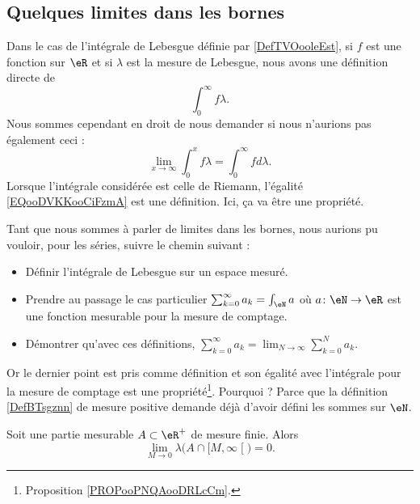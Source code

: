 \subsection{Quelques limites dans les bornes}

Dans le cas de l'intégrale de Lebesgue définie par \ref{DefTVOooleEst}, si \( f\) est une fonction sur \( \eR\) et si \( \lambda\) est la mesure de Lebesgue, nous avons une définition directe de
\begin{equation}
	\int_{0}^{\infty}f\lambda.
\end{equation}
Nous sommes cependant en droit de nous demander si nous n'aurions pas également ceci :
\begin{equation}        \label{EQooDVKKooCiFzmA}
	\lim_{x\to \infty} \int_0^xf\lambda=\int_0^{\infty}fd\lambda.
\end{equation}
Lorsque l'intégrale considérée est celle de Riemann, l'égalité \eqref{EQooDVKKooCiFzmA} est une définition. Ici, ça va être une propriété.

\begin{normaltext}
	Tant que nous sommes à parler de limites dans les bornes, nous aurions pu vouloir, pour les séries, suivre le chemin suivant :
	\begin{itemize}
		\item Définir l'intégrale de Lebesgue sur un espace mesuré.
		\item Prendre au passage le cas particulier \( \sum_{k=0}^{\infty}a_k=\int_\eN a\) où \( a\colon \eN\to \eR\) est une fonction mesurable pour la mesure de comptage.
		\item Démontrer qu'avec ces définitions, \( \sum_{k=0}^{\infty}a_k=\lim_{N\to \infty} \sum_{k=0}^Na_k\).
	\end{itemize}
	Or le dernier point est pris comme définition et son égalité avec l'intégrale pour la mesure de comptage est une propriété\footnote{Proposition \ref{PROPooPNQAooDRLcCm}.}. Pourquoi ? Parce que la définition \ref{DefBTsgznn} de mesure positive demande déjà d'avoir défini les sommes sur \( \eN\).
\end{normaltext}

\begin{lemma}
	Soit une partie mesurable \( A\subset \eR^+\) de mesure finie. Alors
	\begin{equation}
		\lim_{M\to 0} \lambda\big( A\cap\mathopen[ M , \infty \mathclose[ \big)=0.
	\end{equation}
\end{lemma}

